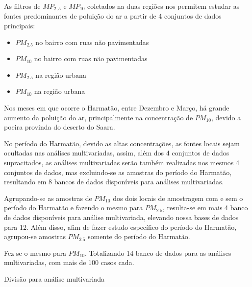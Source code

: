 As filtros de $MP_{2,5}$ e $MP_{10}$ coletados na duas regiões nos permitem 
estudar as fontes predominantes de poluição do ar a partir de 4 
conjuntos de dados principais: 

\begin{itemize}
  \item $PM_{2.5}$ no bairro com ruas não pavimentadas
  \item $PM_{10}$ no bairro com ruas não pavimentadas
  \item $PM_{2.5}$ na região urbana
  \item $PM_{10}$ na região urbana
\end{itemize}

Nos meses em que ocorre o Harmatão, entre Dezembro e Março, há grande aumento da
poluição do ar, principalmente na concentração de $PM_{10}$, devido a poeira 
provinda do deserto do Saara. 

No período do Harmatão, devido as altas concentrações, as fontes locais sejam 
ocultadas nas análises multivariadas, assim, além dos 4 conjuntos de dados 
supracitados, as análises multivariadas serão também realizadas nos mesmos 4 
conjuntos de dados, mas excluindo-se as amostras do período do Harmatão, 
resultando em 8 bancos de dados disponíveis para análises multivariadas. 

Agrupando-se as amostras de $PM_{10}$ dos dois locais de amostragem com e sem 
o período do Harmatão e fazendo o mesmo para $PM_{2.5}$, resulta-se em mais 4 
banco de dados disponíveis para análise multivariada, elevando nossa bases de
dados para 12. Além disso, afim de fazer estudo específico do período do 
Harmatão, agrupou-se amostras $PM_{2.5}$ somente do período do Harmatão. 

Fez-se o mesmo para $PM_{10}$. Totalizando 14 banco de dados para as análises 
multivariadas, com mais de 100 casos cada.  

\begin{table}[H]
  \centering
  
  \caption{Divisão para análise multivariada}
\end{table}

